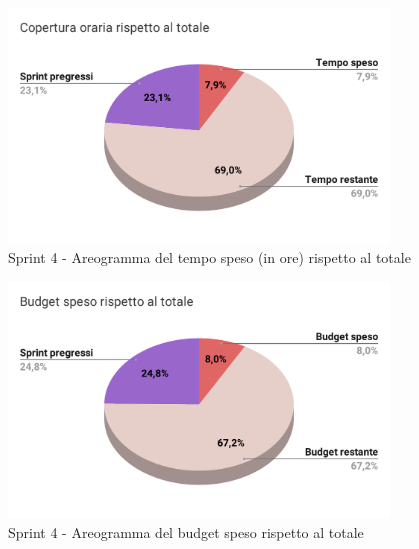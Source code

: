   \begin{figure}[H]
    \centering
    \includegraphics[width=0.90\textwidth]{assets/Consuntivo/Sprint-4/copertura_oraria.pdf}
    \caption{Sprint 4 - Areogramma del tempo speso (in ore) rispetto al totale}
  \end{figure}
  
  \begin{figure}[H]
    \centering
    \includegraphics[width=0.90\textwidth]{assets/Consuntivo/Sprint-4/budget_speso.pdf}
    \caption{Sprint 4 - Areogramma del budget speso rispetto al totale}
  \end{figure}
  

